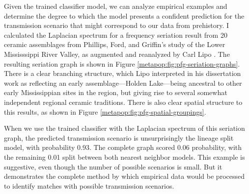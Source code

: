     Given the trained classifier model, we can analyze empirical examples and determine the degree to which the model presents a confident prediction for the transmission scenario that might correspond to our data from prehistory.  I calculated the Laplacian spectrum for a frequency seriation result from 20 ceramic assemblages from Phillips, Ford, and Griffin's \citeyearpar{PFG1951} study of the Lower Mississsippi River Valley, as augmented and reanalyzed by Carl Lipo \citep{Lipo2001}.  The resulting seriation graph is shown in Figure \ref{metapop:fig:pfg-seriation-graphs}.  There is a clear branching structure, which Lipo interpreted in his dissertation work as reflecting an early assemblage---Holden Lake---being ancestral to other early Mississippian sites in the region, but giving rise to several somewhat independent regional ceramic traditions.  There is also clear spatial structure to this results, as shown in Figure \ref{metapop:fig:pfg-spatial-groupings}.  
    
    When we use the trained classifier with the Laplacian spectrum of this seriation graph, the predicted transmission scenario is unsurprisingly the lineage split model, with probability 0.93.  The complete graph scored 0.06 probability, with the remaining 0.01 split between both nearest neighbor models.  This example is suggestive, even though the number of possible scenarios is small.  But it demonstrates the complete method by which empirical data would be processed to identify matches with possible transmission scenarios.
    
